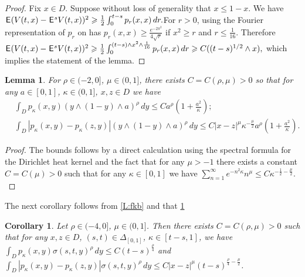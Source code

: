 \documentclass[12pt]{article}
\newtheorem{lemma}[theorem]{Lemma}
\newtheorem{corollary}[theorem]{Corollary}
\theoremstyle{definition}
\DeclareMathOperator{\1}{\mathbbm{1}}%
\def\E{\hskip.15ex\mathsf{E}\hskip.10ex}
\renewcommand{\ge}{\geqslant}
\renewcommand{\le}{\leqslant}
\begin{document}
\begin{proof}
Fix $x\in D$. Suppose without loss of generality that $x\le 1-x$. We have 
$
\E (V(t,x)-\E^s V(t,x))^2 \ge \frac12\int_0^{t-s} p_{r}(x,x)\,dr.
$For $r>0$, using the Fourier representation of $p_r$ on has
$p_r(x,x)\ge \frac{e^{-2\pi^2}}{4\sqrt r}$ if $x^2\ge  r$ and ${r\le\frac1{16}}$.
Therefore
$
\E (V(t,x)-\E^s V(t,x))^2\ge \frac12\int_0^{(t-s)\wedge x^2\wedge \frac1{16}} p_r(x,x)\,dr
\ge  C((t-s)^{1/2}\wedge x),
$
which implies the statement of the lemma.
\end{proof}
\begin{lemma}\label{L:skb} For $\rho\in(-2,0]$,
  $\mu\in(0,1]$,  there exists $C=C(\rho,\mu)>0$ so that for any $a\in[0,1]$, $\kappa\in(0,1]$, $x,z\in D$ we have 
\begin{align*}
&\int_D p_{\kappa}(x,y) (y\wedge (1-y)\wedge a )^{\rho}\, dy\le C
  a^\rho (1+\frac{a^2}{\kappa});\\
&\int_D |p_{\kappa}(x,y)-p_{\kappa}(z,y)| (y\wedge (1-y)\wedge a )^{\rho}\, dy\le C|x-z|^\mu  \kappa^{-\frac\mu2} a^\rho (1+\frac{a^2}{\kappa}).
\end{align*}
\end{lemma}
\begin{proof}
The bounds follows by a direct calculation 
using the spectral formula for the Dirichlet heat kernel and the fact that for any $\mu>-1$ there exists a constant $C=C(\mu)>0$ such that for any 
$\kappa\in[0,1]$ we have $\sum_{n=1}^\infty  e^{-n^2 \kappa } n^\mu\le C \kappa^{-\frac12-\frac\mu2}.$
\end{proof}

The next corollary follows from \cref{L:fkb} and that \cref{L:skb}
\begin{corollary}\label{c:key}
 Let $\rho\in(-4,0]$, $\mu\in(0,1]$. Then there exists $C=C(\rho,\mu)>0$ such that for any $x,z\in D$, $(s,t)\in\Delta_{[0,1]}$, $\kappa\in[ t-s,1]$, we have 
$\int_D p_{\kappa}(x,y) \sigma(s,t,y)^{\rho}\, dy\le
C(t-s)^{\frac\rho4}$ and
$\int_D |p_{\kappa}(x,y)-p_{\kappa}(z,y)| \sigma(s,t,y)^{\rho}\, dy\le C|x-z|^{\mu}(t-s)^{\frac\rho4-\frac\mu2}$. 
\end{corollary}
\end{document}
